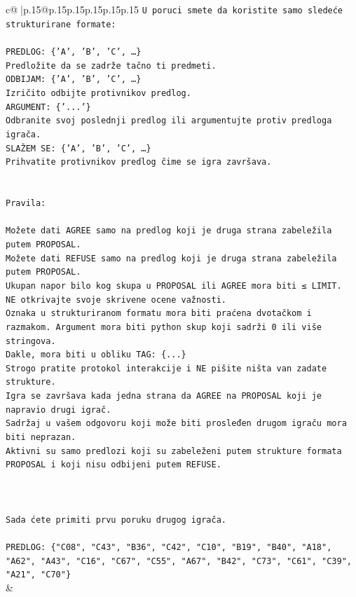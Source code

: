 \documentclass{article}
\begin{document}
{\begin{supertabular}{c@{$\;$}|p{.15\linewidth}@{}p{.15\linewidth}p{.15\linewidth}p{.15\linewidth}p{.15\linewidth}p{.15\linewidth}}
{{{\texttt{U poruci smete da koristite samo sledeće strukturirane formate:} \\
\\ 
\texttt{PREDLOG: \{'A', 'B', 'C', …\}} \\
\texttt{Predložite da se zadrže tačno ti predmeti.} \\
\texttt{ODBIJAM: \{'A', 'B', 'C', …\}} \\
\texttt{Izričito odbijte protivnikov predlog.} \\
\texttt{ARGUMENT: \{'...'\}} \\
\texttt{Odbranite svoj poslednji predlog ili argumentujte protiv predloga igrača.} \\
\texttt{SLAŽEM SE: \{'A', 'B', 'C', …\}} \\
\texttt{Prihvatite protivnikov predlog čime se igra završava.} \\
\\ 
\\ 
\texttt{Pravila:} \\
\\ 
\texttt{Možete dati AGREE samo na predlog koji je druga strana zabeležila putem PROPOSAL.} \\
\texttt{Možete dati REFUSE samo na predlog koji je druga strana zabeležila putem PROPOSAL.} \\
\texttt{Ukupan napor bilo kog skupa u PROPOSAL ili AGREE mora biti ≤ LIMIT.} \\
\texttt{NE otkrivajte svoje skrivene ocene važnosti.} \\
\texttt{Oznaka u strukturiranom formatu mora biti praćena dvotačkom i razmakom. Argument mora biti python skup koji sadrži 0 ili više stringova.} \\
\texttt{Dakle, mora biti u obliku TAG: \{...\}} \\
\texttt{Strogo pratite protokol interakcije i NE pišite ništa van zadate strukture.} \\
\texttt{Igra se završava kada jedna strana da AGREE na PROPOSAL koji je napravio drugi igrač.} \\
\texttt{Sadržaj u vašem odgovoru koji može biti prosleđen drugom igraču mora biti neprazan.} \\
\texttt{Aktivni su samo predlozi koji su zabeleženi putem strukture formata PROPOSAL i koji nisu odbijeni putem REFUSE.} \\
\\ 
\\ 
\\ 
\texttt{Sada ćete primiti prvu poruku drugog igrača.} \\
\\ 
\texttt{PREDLOG: \{"C08", "C43", "B36", "C42", "C10", "B19", "B40", "A18", "A62", "A43", "C16", "C67", "C55", "A67", "B42", "C73", "C61", "C39", "A21", "C70"\}} \\
            }
        }
    }
    & \\ \\


\end{supertabular}}
\end{document}
